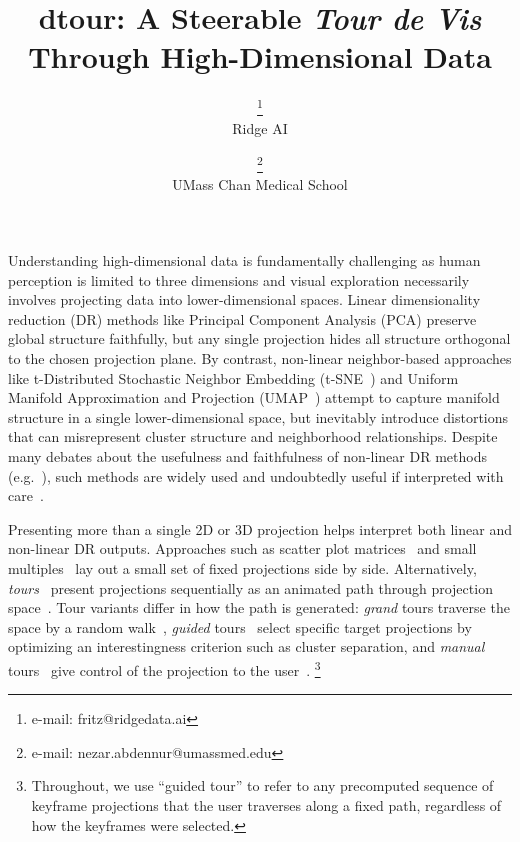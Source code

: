 \documentclass{vgtc}
\title{dtour: A Steerable \emph{Tour de Vis} Through High-Dimensional Data}
\author{\authororcid{Fritz Lekschas}{0000-0001-8432-4835}\thanks{e-mail: fritz@ridgedata.ai}\\ %
        \scriptsize Ridge AI %
\and \authororcid{Nezar Abdennur}{0000-0001-5814-0864}\thanks{e-mail: nezar.abdennur@umassmed.edu}\\ %
     \scriptsize UMass Chan Medical School %
}
\begin{document}
\label{sec:intro}

\maketitle

Understanding high-dimensional data is fundamentally challenging as human perception is limited to three dimensions and visual exploration necessarily involves projecting data into lower-dimensional spaces. Linear dimensionality reduction (DR) methods like Principal Component Analysis (PCA) preserve global structure faithfully, but any single projection hides all structure orthogonal to the chosen projection plane. By contrast, non-linear neighbor-based approaches like t-Distributed Stochastic Neighbor Embedding (t-SNE~\cite{van2008visualizing}) and Uniform Manifold Approximation and Projection (UMAP~\cite{mcinnes2018umap}) attempt to capture manifold structure in a single lower-dimensional space, but inevitably introduce distortions that can misrepresent cluster structure and neighborhood relationships. Despite many debates about the usefulness and faithfulness of non-linear DR methods (e.g.~\cite{chari2023specious,lause2024art}), such methods are widely used and undoubtedly useful if interpreted with care~\cite{wattenberg2016how,kobak2019art,becht2019dimensionality}.

Presenting more than a single 2D or 3D projection helps interpret both linear and non-linear DR outputs. Approaches such as scatter plot matrices~\cite{chambers1983graphical} and small multiples~\cite{tufte1983visual} lay out a small set of fixed projections side by side. Alternatively, \emph{tours}~\cite{asimov1985grand,buja2005computational} present projections sequentially as an animated path through projection space~\cite{swayne2001ggobi,wickham2011tourr}. Tour variants differ in how the path is generated: \emph{grand} tours traverse the space by a random walk~\cite{asimov1985grand,buja1986grand}, \emph{guided} tours~\cite{cook1995grand} select specific target projections by optimizing an interestingness criterion such as cluster separation, and \emph{manual} tours~\cite{cook1997manual} give control of the projection to the user~\cite{li2020visualizing}.%
\footnote{Throughout, we use ``guided tour'' to refer to any precomputed sequence of keyframe projections that the user traverses along a fixed path, regardless of how the keyframes were selected.
}
\end{document}
